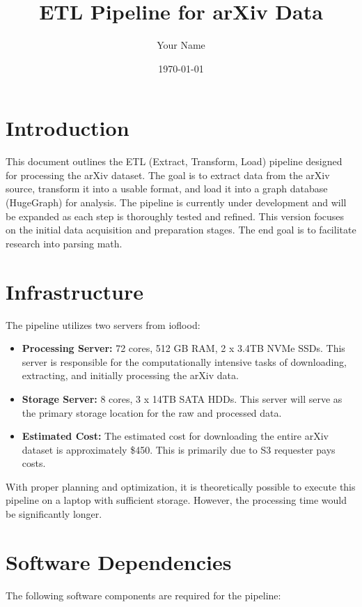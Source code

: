 \documentclass{article}
\title{ETL Pipeline for arXiv Data}
\author{Your Name}
\date{\today}
\begin{document}
\maketitle

\section{Introduction}

This document outlines the ETL (Extract, Transform, Load) pipeline designed for processing the arXiv dataset. The goal is to extract data from the arXiv source, transform it into a usable format, and load it into a graph database (HugeGraph) for analysis. The pipeline is currently under development and will be expanded as each step is thoroughly tested and refined. This version focuses on the initial data acquisition and preparation stages.  The end goal is to facilitate research into parsing math. 

\section{Infrastructure}

The pipeline utilizes two servers from ioflood:

\begin{itemize}
    \item \textbf{Processing Server:} 72 cores, 512 GB RAM, 2 x 3.4TB NVMe SSDs. This server is responsible for the computationally intensive tasks of downloading, extracting, and initially processing the arXiv data.
    \item \textbf{Storage Server:} 8 cores, 3 x 14TB SATA HDDs.  This server will serve as the primary storage location for the raw and processed data.
    \item \textbf{Estimated Cost:} The estimated cost for downloading the entire arXiv dataset is approximately \$450.  This is primarily due to S3 requester pays costs.
\end{itemize}

With proper planning and optimization, it is theoretically possible to execute this pipeline on a laptop with sufficient storage. However, the processing time would be significantly longer.

\section{Software Dependencies}

The following software components are required for the pipeline:
\end{document}
